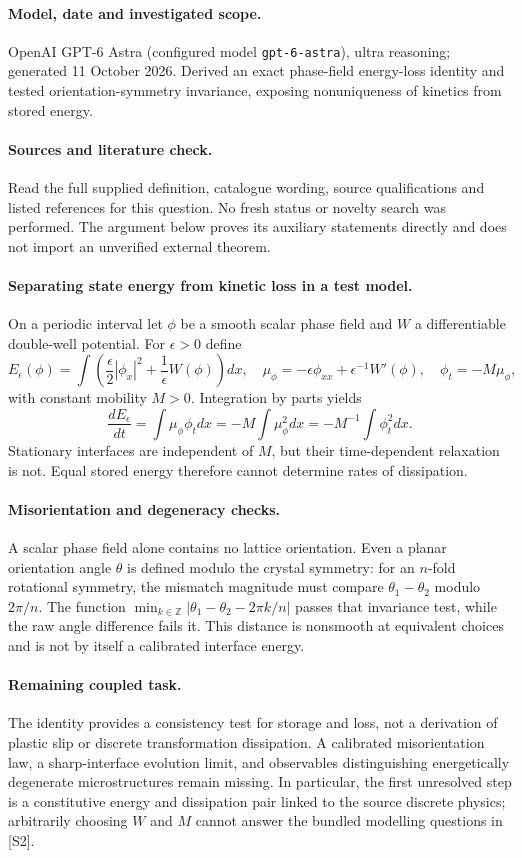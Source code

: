\documentclass[11pt]{article}
\begin{document}
\paragraph{Model, date and investigated scope.}
OpenAI GPT-6 Astra (configured model \texttt{gpt-6-astra}), ultra reasoning; generated 11 October 2026. Derived an exact phase-field energy-loss identity and tested orientation-symmetry invariance, exposing nonuniqueness of kinetics from stored energy.

\paragraph{Sources and literature check.}
Read the full supplied definition, catalogue wording, source qualifications and listed references for this question. No fresh status or novelty search was performed. The argument below proves its auxiliary statements directly and does not import an unverified external theorem.

\paragraph{Separating state energy from kinetic loss in a test model.} On a periodic interval let \(\phi\) be a smooth scalar phase field and \(W\) a differentiable double-well potential. For \(\epsilon>0\) define
\[
 E_\epsilon(\phi)=\int\left(\frac\epsilon2|\phi_x|^2+\frac1\epsilon W(\phi)\right)dx,
 \quad \mu_\phi=-\epsilon\phi_{xx}+\epsilon^{-1}W'(\phi),
 \quad \phi_t=-M\mu_\phi,
\]
with constant mobility \(M>0\). Integration by parts yields
\[
 \frac{dE_\epsilon}{dt}=\int\mu_\phi\phi_tdx
 =-M\int\mu_\phi^2dx=-M^{-1}\int\phi_t^2dx.
\]
Stationary interfaces are independent of \(M\), but their time-dependent relaxation is not. Equal stored energy therefore cannot determine rates of dissipation.
\paragraph{Misorientation and degeneracy checks.} A scalar phase field alone contains no lattice orientation. Even a planar orientation angle \(\theta\) is defined modulo the crystal symmetry: for an \(n\)-fold rotational symmetry, the mismatch magnitude must compare \(\theta_1-\theta_2\) modulo \(2\pi/n\). The function \(\min_{k\in\mathbb Z}|\theta_1-\theta_2-2\pi k/n|\) passes that invariance test, while the raw angle difference fails it. This distance is nonsmooth at equivalent choices and is not by itself a calibrated interface energy.
\paragraph{Remaining coupled task.} The identity provides a consistency test for storage and loss, not a derivation of plastic slip or discrete transformation dissipation. A calibrated misorientation law, a sharp-interface evolution limit, and observables distinguishing energetically degenerate microstructures remain missing. In particular, the first unresolved step is a constitutive energy and dissipation pair linked to the source discrete physics; arbitrarily choosing \(W\) and \(M\) cannot answer the bundled modelling questions in [S2].
\end{document}
